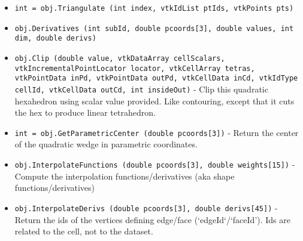 \begin{itemize}
\item  \verb|int = obj.Triangulate (int index, vtkIdList ptIds, vtkPoints pts)|

\item  \verb|obj.Derivatives (int subId, double pcoords[3], double values, int dim, double derivs)|

\item  \verb|obj.Clip (double value, vtkDataArray cellScalars, vtkIncrementalPointLocator locator, vtkCellArray tetras, vtkPointData inPd, vtkPointData outPd, vtkCellData inCd, vtkIdType cellId, vtkCellData outCd, int insideOut)| -  Clip this quadratic hexahedron using scalar value provided. Like
 contouring, except that it cuts the hex to produce linear
 tetrahedron.

\item  \verb|int = obj.GetParametricCenter (double pcoords[3])| -  Return the center of the quadratic wedge in parametric coordinates.

\item  \verb|obj.InterpolateFunctions (double pcoords[3], double weights[15])| -  Compute the interpolation functions/derivatives
 (aka shape functions/derivatives)

\item  \verb|obj.InterpolateDerivs (double pcoords[3], double derivs[45])| -  Return the ids of the vertices defining edge/face (`edgeId`/`faceId').
 Ids are related to the cell, not to the dataset.

\end{itemize}
